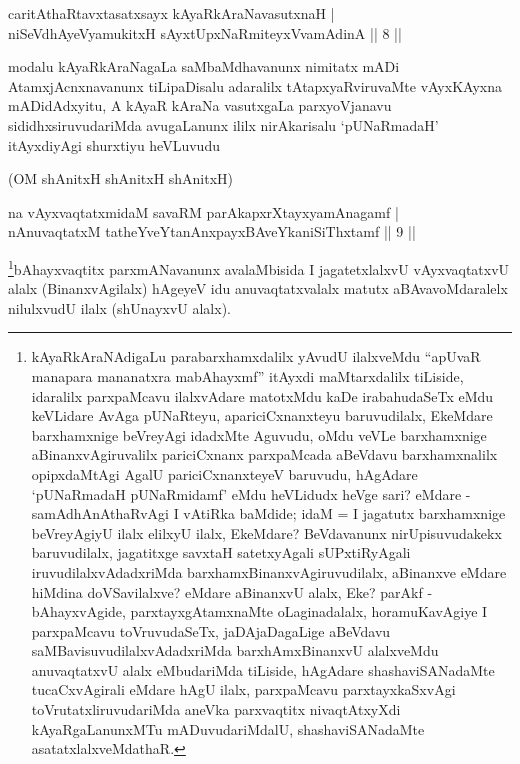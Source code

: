 \begin{shl}
caritAthaRtavxtasatxsayx kAyaRkAraNavasutxnaH  | \\
niSeVdhAyeVyamukitxH sAyxtUpxNaRmiteyxVvamAdinA \hfill||  8 ||  
\end{shl}

\begin{artha}
modalu kAyaRkAraNagaLa saMbaMdhavanunx nimitatx mADi AtamxjAcnxnavanunx tiLipaDisalu adaralilx tAtapxyaRviruvaMte vAyxKAyxna mADidAdxyitu, A kAyaR kAraNa vasutxgaLa parxyoVjanavu sididhxsiruvudariMda avugaLanunx ililx nirAkarisalu `pUNaRmadaH' itAyxdiyAgi shurxtiyu heVLuvudu \mdash 
\end{artha}

\begin{center}
(OM shAnitxH shAnitxH shAnitxH)
\end{center}


\begin{shl}
na vAyxvaqtatxmidaM savaRM parAkapxrXtayxyamAnagamf  | \\
nAnuvaqtatxM tatheYveYtanAnxpayxBAveYkaniSiThxtamf \hfill||  9 ||  
\end{shl}

\begin{artha}
\footnote{kAyaRkAraNAdigaLu parabarxhamxdalilx yAvudU ilalxveMdu ``apUvaR manapara mananatxra mabAhayxmf'' itAyxdi maMtarxdalilx tiLiside, idaralilx parxpaMcavu ilalxvAdare matotxMdu kaDe irabahudaSeTx eMdu keVLidare AvAga pUNaRteyu, apariciCxnanxteyu baruvudilalx, EkeMdare barxhamxnige beVreyAgi idadxMte Aguvudu, oMdu veVLe barxhamxnige aBinanxvAgiruvalilx pariciCxnanx parxpaMcada aBeVdavu barxhamxnalilx opipxdaMtAgi AgalU pariciCxnanxteyeV baruvudu, hAgAdare `pUNaRmadaH pUNaRmidamf' eMdu heVLidudx heVge sari? eMdare - samAdhAnAthaRvAgi I vAtiRka baMdide; idaM = I jagatutx barxhamxnige beVreyAgiyU ilalx elilxyU ilalx, EkeMdare? BeVdavanunx nirUpisuvudakekx baruvudilalx, jagatitxge savxtaH satetxyAgali sUPxtiRyAgali iruvudilalxvAdadxriMda barxhamxBinanxvAgiruvudilalx, aBinanxve eMdare hiMdina doVSavilalxve? eMdare aBinanxvU alalx, Eke? parAkf - bAhayxvAgide, parxtayxgAtamxnaMte oLaginadalalx, horamuKavAgiye I parxpaMcavu toVruvudaSeTx, jaDAjaDagaLige aBeVdavu saMBavisuvudilalxvAdadxriMda barxhAmxBinanxvU alalxveMdu anuvaqtatxvU alalx eMbudariMda tiLiside, hAgAdare shashaviSANadaMte tucaCxvAgirali eMdare hAgU ilalx, parxpaMcavu parxtayxkaSxvAgi toVrutatxliruvudariMda aneVka parxvaqtitx nivaqtAtxyXdi kAyaRgaLanunxMTu mADuvudariMdalU, shashaviSANadaMte asatatxlalxveMdathaR.}bAhayxvaqtitx parxmANavanunx avalaMbisida I jagatetxlalxvU vAyxvaqtatxvU alalx (BinanxvAgilalx) hAgeyeV idu anuvaqtatxvalalx matutx aBAvavoMdaralelx nilulxvudU ilalx (shUnayxvU alalx).
\end{artha}

